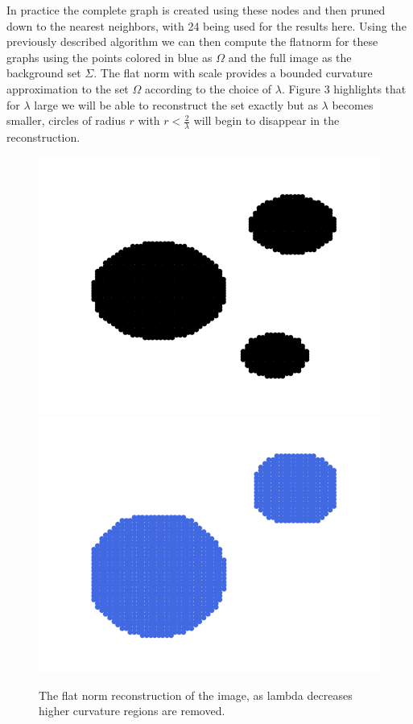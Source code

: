 \documentclass[12pt]{article}
\begin{document}
In practice the complete graph is created using these nodes and then pruned down to the nearest neighbors, with 24 being used for the results here. Using the previously described algorithm we can then compute the flatnorm for these graphs using the points colored in blue as $\Omega$ and the full image as the background set $\Sigma$. The flat norm with scale provides a bounded curvature approximation to the set $\Omega$ according to the choice of $\lambda$. Figure 3 highlights that for $\lambda$ large we will be able to reconstruct the set exactly but as $\lambda$ becomes smaller, circles of radius $r$ with $r < \frac{2}{\lambda}$ will begin to disappear in the reconstruction.


\begin{figure}[H]
	\centering
	\includegraphics[scale=0.4]{figures/circlesgraph.png}
	\includegraphics[scale=0.4]{figures/circlesdisappear.png}
	\caption{The flat norm reconstruction of the image, as lambda decreases higher curvature regions are removed.}
\end{figure}
\end{document}
